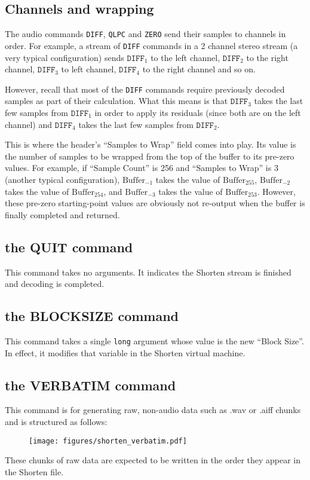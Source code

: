 \subsection{Channels and wrapping}
The audio commands \texttt{DIFF}, \texttt{QLPC} and \texttt{ZERO} send
their samples to channels in order.
For example, a stream of \texttt{DIFF} commands in a 2 channel stereo
stream (a very typical configuration) sends $\texttt{DIFF}_1$ to
the left channel, $\texttt{DIFF}_2$ to the right channel,
$\texttt{DIFF}_3$ to left channel, $\texttt{DIFF}_4$ to the right channel
and so on.

However, recall that most of the \texttt{DIFF} commands require
previously decoded samples as part of their calculation.
What this means is that $\texttt{DIFF}_3$ takes the last
few samples from $\texttt{DIFF}_1$ in order to apply its residuals
(since both are on the left channel) and $\texttt{DIFF}_4$
takes the last few samples from $\texttt{DIFF}_2$.

This is where the header's ``Samples to Wrap'' field comes into play.
Its value is the number of samples to be wrapped from the top of the buffer
to its pre-zero values.
For example, if ``Sample Count'' is 256 and ``Samples to Wrap'' is 3
(another typical configuration),
$\text{Buffer}_{-1}$ takes the value of $\text{Buffer}_{255}$,
$\text{Buffer}_{-2}$ takes the value of $\text{Buffer}_{254}$, and
$\text{Buffer}_{-3}$ takes the value of $\text{Buffer}_{253}$.
However, these pre-zero starting-point values are obviously not
re-output when the buffer is finally completed and returned.

\subsection{the QUIT command}

This command takes no arguments.
It indicates the Shorten stream is finished and decoding is completed.

\subsection{the BLOCKSIZE command}

This command takes a single \texttt{long} argument
whose value is the new ``Block Size''.
In effect, it modifies that variable in the Shorten virtual machine.

\subsection{the VERBATIM command}

This command is for generating raw, non-audio data such
as .wav or .aiff chunks and is structured as follows:
\begin{figure}[h]
\texttt{[image: figures/shorten\_verbatim.pdf]}
\end{figure}
\par
\noindent
These chunks of raw data are expected to be written in the order
they appear in the Shorten file.

